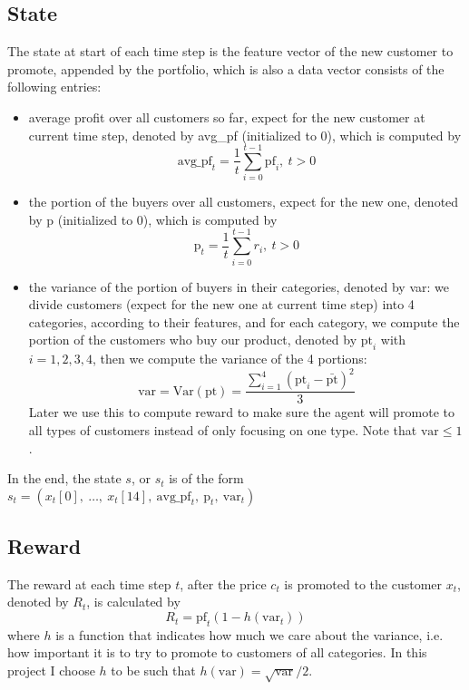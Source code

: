 \documentclass[11pt]{article}
\begin{document}
\subsection{State}
The state at start of each time step is the feature vector of the new customer 
to promote, appended by the portfolio, which is also a data vector consists of
the following entries:
\begin{itemize}
    \item average profit over all customers so far, expect for the new customer
        at current time step, denoted by avg\_pf (initialized to \(0\)), 
        which is computed by
        \[\text{avg\_pf}_t = \frac{1}{t}\sum_{i=0}^{t-1} \text{pf}_i, \:t>0\]
    \item the portion of the buyers over all customers, expect for the new one,
        denoted by p (initialized to 0), which is computed by
        \[\text{p}_t=\frac{1}{t}\sum_{i=0}^{t-1} r_i, \:t>0\]
    \item the variance of the portion of buyers in their categories, denoted 
        by var: we divide customers (expect for the new one at current time 
        step) into 4 categories, according to their features, and for each 
        category, we compute the portion of the customers who buy our product,
        denoted by \(\text{pt}_i\) with \(i=1, 2, 3, 4\), then we compute the 
        variance of the 4 portions:
        \[\text{var}=\text{Var}(\text{pt})=\frac{\sum_{i=1}^{4} 
        \left(\text{pt}_i-\bar{\text{pt}}\right)^2}{3}\]
        Later we use this to compute reward to 
        make sure the agent will promote to all types of customers instead of 
        only focusing on one type.
        \vspace{2mm}\newline Note that \(\text{var}\leq1\).
\end{itemize}
In the end, the state \(s\), or \(s_t\) is of the form 
\(s_t=(x_t[0],\:\dots,\:x_t[14],\:\text{avg\_pf}_t,\:\text{p}_t,
\:\text{var}_t)\)

\subsection{Reward}
The reward at each time step \(t\), after the price \(c_t\) is promoted to the 
customer \(x_t\), denoted by \(R_t\), is calculated by
\[R_t = \text{pf}_t\left(1-h(\text{var}_t)\right)\]
where \(h\) is a function that indicates how much we care about the variance,
i.e. how important it is to try to promote to customers of all categories. In
this project I choose \(h\) to be such that 
\(h(\text{var}) = \sqrt{\text{var}}/2\).
\end{document}
